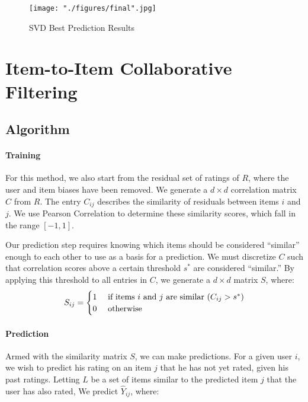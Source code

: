 \documentclass[12pt]{article}
\begin{document}
\begin{figure}[!ht]
\begin{center}
\caption{SVD Best Prediction Results}
\label{fig:svd_results}
    \texttt{[image: "./figures/final".jpg]}
\end{center}
\end{figure}

\section{Item-to-Item Collaborative Filtering}

\subsection*{Algorithm}
\paragraph{Training} For this method, we also start from the residual set of ratings of $R$, where the user and item biases have been removed. We generate a $d \times d$ correlation matrix $C$ from $R$. The entry ${C}_{ij}$ describes the similarity of residuals between items $i$ and $j$. We use Pearson Correlation to determine these similarity scores, which fall in the range $[-1, 1]$.


Our prediction step requires knowing which items should be considered ``similar'' enough to each other to use as a basis for a prediction. We must discretize ${C}$ such that correlation scores above a certain threshold $s^*$ are considered ``similar.''\textsuperscript{\cite{sarwar}} By applying this threshold to all entries in ${C}$, we generate a $d \times d$ matrix ${S}$, where:
$$
{S}_{ij} =
\begin{cases}
    \hfill 1    \hfill & \text{ if items $i$ and $j$ are similar ($C_{ij} > s^*$)} \\
    \hfill 0    \hfill & \text{ otherwise} \\
\end{cases}
$$

\paragraph{Prediction} Armed with the similarity matrix ${S}$, we can make predictions. For a given user $i$, we wish to predict his rating on an item $j$ that he has not yet rated, given his past ratings. Letting $L$ be a set of items similar to the predicted item $j$ that the user has also rated, We predict $\hat Y_{ij}$, where:
\end{document}
